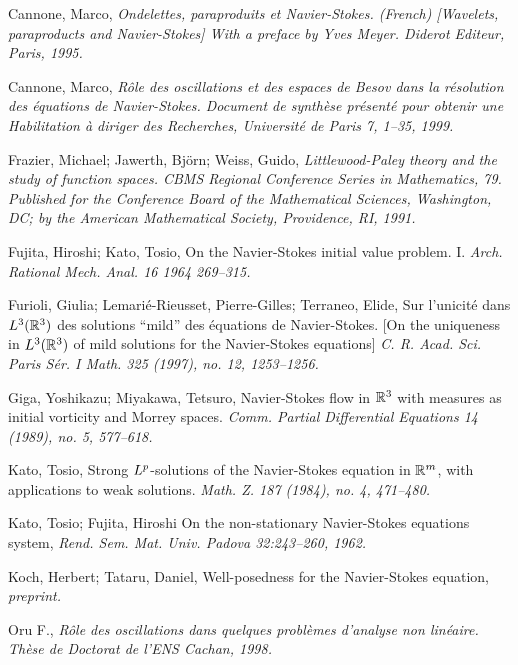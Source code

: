 \documentclass[12pt]{article}
\newcommand{\R}{{\mathbb R}}
\begin{document}
\begin{thebibliography}{999}

Cannone, Marco, {\em Ondelettes, paraproduits et Navier-Stokes. (French) 
[Wavelets, paraproducts and Navier-Stokes] With a preface by Yves
Meyer. Diderot Editeur, Paris, 1995.}

Cannone, Marco, {\em R\^ole des oscillations et des espaces de Besov 
dans la r\'esolution des \'equations de Navier-Stokes. 
Document de synth\`ese pr\'esent\'e pour obtenir une Habilitation \`a 
diriger des Recherches, Universit\'e de Paris 7, 1--35, 1999.}

Frazier, Michael; Jawerth, Bj\"orn; Weiss, Guido, 
{\em Littlewood-Paley theory and the study of function spaces. 
CBMS Regional Conference
Series in Mathematics, 79. 
Published for the Conference Board of the Mathematical Sciences, 
Washington, DC; by the American Mathematical Society,
Providence, RI, 1991.}

Fujita, Hiroshi; Kato, Tosio, 
On the Navier-Stokes initial value problem. I. 
{\em Arch. Rational Mech. Anal. 16 1964 269--315.}

Furioli, Giulia; Lemari\'e-Rieusset, Pierre-Gilles; Terraneo, Elide, 
Sur l'unicit\'e dans $L\sp 3({\R}\sp 3)$ des solutions ``mild'' des 
\'equations de Navier-Stokes.
[On the uniqueness in
$L\sp 3({\R}\sp 3)$ of mild solutions for the Navier-Stokes equations] 
{\em C. R. Acad. Sci. Paris S\'er. I Math. 325 (1997), no. 12, 1253--1256.}

Giga, Yoshikazu; Miyakawa, Tetsuro, Navier-Stokes flow in 
$\R\sp 3$ with measures as initial vorticity and Morrey spaces. 
{\em Comm.
Partial Differential Equations 14 (1989), no. 5, 577--618.}

Kato, Tosio, Strong $L\sp{p}$-solutions of the Navier-Stokes equation in 
${\R}\sp{m}$, with applications to weak solutions. 
{\em Math.
Z. 187 (1984), no. 4, 471--480.}

Kato, Tosio; Fujita, Hiroshi  
On the non-stationary 
Navier-Stokes equations system, 
{\em Rend. Sem. Mat. Univ. 
Padova 32:243--260, 1962.}

Koch, Herbert; Tataru, Daniel,
Well-posedness for the Navier-Stokes equation, 
{\em preprint.}

 Oru F.,
{\em R\^ole des oscillations dans quelques probl\`emes d'analyse non 
lin\'eaire. Th\`ese de Doctorat de l'ENS Cachan, 1998.}

\end{thebibliography}
\end{document}
